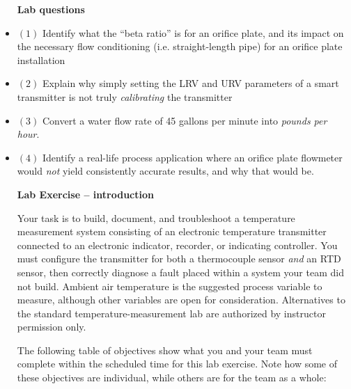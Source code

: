 \begin{itemize}
\noindent
{\bf Lab questions}

\vskip 20pt

\item{$(1)$} Identify what the ``beta ratio'' is for an orifice plate, and its impact on the necessary flow conditioning (i.e. straight-length pipe) for an orifice plate installation

\vskip 20pt

\item{$(2)$} Explain why simply setting the LRV and URV parameters of a smart transmitter is not truly {\it calibrating} the transmitter

\vskip 20pt

\item{$(3)$} Convert a water flow rate of 45 gallons per minute into {\it pounds per hour}.

\vskip 20pt

\item{$(4)$} Identify a real-life process application where an orifice plate flowmeter would {\it not} yield consistently accurate results, and why that would be.
 








\noindent
{\bf Lab Exercise -- introduction}

\vskip 5pt

Your task is to build, document, and troubleshoot a temperature measurement system consisting of an electronic temperature transmitter connected to an electronic indicator, recorder, or indicating controller.  You must configure the transmitter for both a thermocouple sensor {\it and} an RTD sensor, then correctly diagnose a fault placed within a system your team did not build.  Ambient air temperature is the suggested process variable to measure, although other variables are open for consideration.  Alternatives to the standard temperature-measurement lab are authorized by instructor permission only.

The following table of objectives show what you and your team must complete within the scheduled time for this lab exercise.  Note how some of these objectives are individual, while others are for the team as a whole:


\end{itemize}
